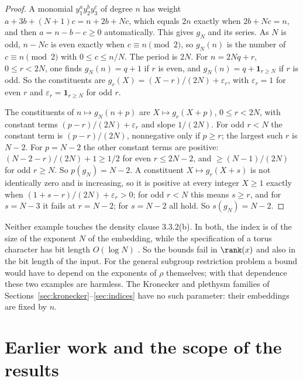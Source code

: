 \begin{proof}
A monomial $y_1^ay_2^by_3^c$ of degree $n$ has weight $a+3b+(N+1)c=n+2b+Nc$,
which equals $2n$ exactly when $2b+Nc=n$, and then $a=n-b-c\ge0$ automatically.
This gives $g_N$ and its series. As $N$ is odd, $n-Nc$ is even exactly when
$c\equiv n\pmod2$, so $g_N(n)$ is the number of $c\equiv n\pmod2$ with
$0\le c\le n/N$. The period is $2N$. For $n=2Nq+r$, $0\le r<2N$, one finds
$g_N(n)=q+1$ if $r$ is even, and $g_N(n)=q+\mathbf1_{r\ge N}$ if $r$ is odd. So
the constituents are $g_r(X)=(X-r)/(2N)+\varepsilon_r$, with $\varepsilon_r=1$
for even $r$ and $\varepsilon_r=\mathbf1_{r\ge N}$ for odd $r$.

The constituents of $n\mapsto g_N(n+p)$ are $X\mapsto g_r(X+p)$, $0\le r<2N$,
with constant terms $(p-r)/(2N)+\varepsilon_r$ and slope $1/(2N)$. For odd
$r<N$ the constant term is $(p-r)/(2N)$, nonnegative only if $p\ge r$; the
largest such $r$ is $N-2$. For $p=N-2$ the other constant terms are positive:
$(N-2-r)/(2N)+1\ge1/2$ for even $r\le2N-2$, and $\ge(N-1)/(2N)$ for odd
$r\ge N$. So $p(g_N)=N-2$. A constituent $X\mapsto g_r(X+s)$ is not
identically zero and is increasing, so it is positive at every integer $X\ge1$
exactly when $(1+s-r)/(2N)+\varepsilon_r>0$; for odd $r<N$ this means $s\ge r$,
and for $s=N-3$ it fails at $r=N-2$; for $s=N-2$ all hold. So $s(g_N)=N-2$.
\end{proof}

Neither example touches the density clause 3.3.2(b). In both, the index is of
the size of the exponent $N$ of the embedding, while the specification of a
torus character has bit length $O(\log N)$ \cite[Section 3.4.2, p.~56]{GCT6}.
So the bounds fail in $\rank(x)$ and also in the bit length of the input. For
the general subgroup restriction problem a bound would have to depend on the
exponents of $\rho$ themselves; with that dependence these two examples are
harmless. The Kronecker and plethysm families of
Sections~\ref{sec:kronecker}--\ref{sec:indices} have no such parameter: their
embeddings are fixed by $n$.

\section{Earlier work and the scope of the results}\label{sec:literature}

